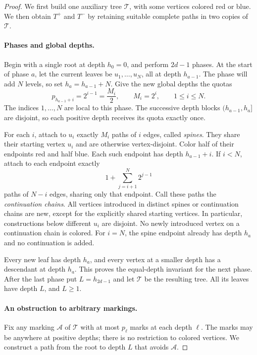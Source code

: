 \begin{proof}
We first build one auxiliary tree $\mathcal T$, with some vertices colored
red or blue.  We then obtain $T^+$ and $T^-$ by retaining suitable complete
paths in two copies of $\mathcal T$.

\paragraph{Phases and global depths.}
Begin with a single root at depth $h_0=0$, and perform $2d-1$ phases.
At the start of phase $a$, let the current leaves be
$u_1,\ldots,u_N$, all at depth $h_{a-1}$.  The phase will add $N$ levels,
so set $h_a=h_{a-1}+N$.  Give the new global depths the quotas
\begin{equation}\label{eq:tree-phase-quotas}
 p_{h_{a-1}+i}=2^{i-1}=\frac{M_i}{2},
 \qquad M_i=2^i,\qquad 1\le i\le N.
\end{equation}
The indices $1,\ldots,N$ are local to this phase.  The successive depth
blocks $(h_{a-1},h_a]$ are disjoint, so each positive depth receives its
quota exactly once.

For each $i$, attach to $u_i$ exactly $M_i$ paths of $i$ edges, called
\emph{spines}.  They share their starting vertex $u_i$ and are otherwise
vertex-disjoint.  Color half of their endpoints red and half blue.  Each
such endpoint has depth $h_{a-1}+i$.  If $i<N$, attach to each endpoint
exactly
\begin{equation}\label{eq:tree-continuations}
 1+\sum_{j=i+1}^{N}2^{j-1}
\end{equation}
paths of $N-i$ edges, sharing only that endpoint.  Call these paths the
\emph{continuation chains}.  All vertices introduced in distinct spines
or continuation chains are new, except for the explicitly shared starting
vertices.  In particular, constructions below different $u_i$ are
disjoint.  No newly introduced vertex on a continuation chain is colored.
For $i=N$, the spine endpoint already has depth $h_a$ and no continuation
is added.

Every new leaf has depth $h_a$, and every vertex at a smaller depth has
a descendant at depth $h_a$.  This proves the equal-depth invariant for
the next phase.  After the last phase put $L=h_{2d-1}$ and let
$\mathcal T$ be the resulting tree.  All its leaves have depth $L$, and
$L\ge1$.

\paragraph{An obstruction to arbitrary markings.}
Fix any marking $\mathcal A$ of $\mathcal T$ with at most $p_\ell$ marks
at each depth $\ell$.  The marks may be anywhere at positive depths;
there is no restriction to colored vertices.  We construct a path from
the root to depth $L$ that avoids $\mathcal A$.


\end{proof}
